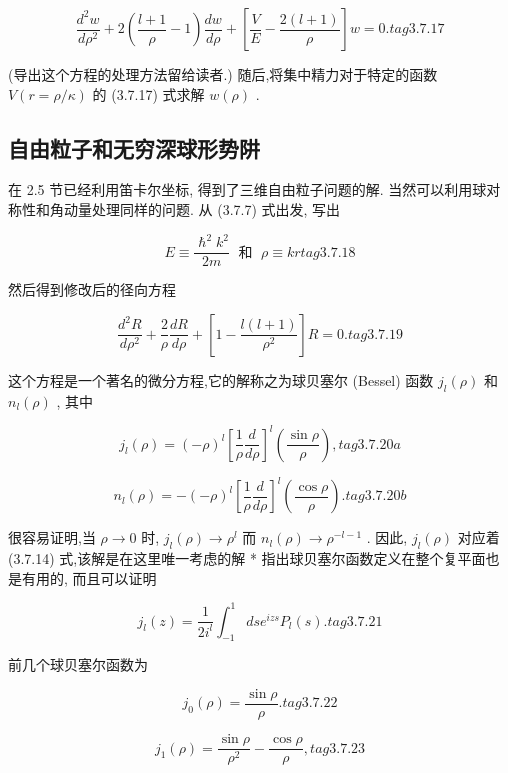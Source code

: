 $$
\frac{{d}^{2}w}{d{\rho }^{2}} + 2\left( {\frac{l + 1}{\rho } - 1}\right) \frac{dw}{d\rho } + \left\lbrack {\frac{V}{E} - \frac{2\left( {l + 1}\right) }{\rho }}\right\rbrack w = 0. tag{3. 7.17}
$$

(导出这个方程的处理方法留给读者.) 随后,将集中精力对于特定的函数 $V\left( {r = \rho /\kappa }\right)$ 的 (3.7.17) 式求解 $w\left( \rho \right)$ .

\subsection{自由粒子和无穷深球形势阱}

在 2.5 节已经利用笛卡尔坐标, 得到了三维自由粒子问题的解. 当然可以利用球对称性和角动量处理同样的问题. 从 (3.7.7) 式出发, 写出

$$
E \equiv \frac{{\hslash }^{2}{k}^{2}}{2m}\;\text{ 和 }\;\rho \equiv {kr} tag{3. 7.18}
$$

然后得到修改后的径向方程

$$
\frac{{d}^{2}R}{d{\rho }^{2}} + \frac{2}{\rho }\frac{dR}{d\rho } + \left\lbrack {1 - \frac{l\left( {l + 1}\right) }{{\rho }^{2}}}\right\rbrack R = 0. tag{3. 7.19}
$$

这个方程是一个著名的微分方程,它的解称之为球贝塞尔 (Bessel) 函数 ${j}_{l}\left( \rho \right)$ 和 ${n}_{l}\left( \rho \right)$ , 其中

$$
{j}_{l}\left( \rho \right) = {\left( -\rho \right) }^{l}{\left\lbrack \frac{1}{\rho }\frac{d}{d\rho }\right\rbrack }^{l}\left( \frac{\sin \rho }{\rho }\right) , tag{3. 7. 20a}
$$

$$
{n}_{l}\left( \rho \right) = - {\left( -\rho \right) }^{l}{\left\lbrack \frac{1}{\rho }\frac{d}{d\rho }\right\rbrack }^{l}\left( \frac{\cos \rho }{\rho }\right) . tag{3. 7. 20b}
$$

很容易证明,当 $\rho \rightarrow 0$ 时, ${j}_{l}\left( \rho \right) \rightarrow {\rho }^{l}$ 而 ${n}_{l}\left( \rho \right) \rightarrow {\rho }^{-l - 1}$ . 因此, ${j}_{l}\left( \rho \right)$ 对应着 (3.7.14) 式,该解是在这里唯一考虑的解 * 指出球贝塞尔函数定义在整个复平面也是有用的, 而且可以证明

$$
{j}_{l}\left( z\right) = \frac{1}{2{i}^{l}}{\int }_{-1}^{1}{ds}{e}^{izs}{P}_{l}\left( s\right) . tag{3. 7.21}
$$

前几个球贝塞尔函数为

$$
{j}_{0}\left( \rho \right) = \frac{\sin \rho }{\rho }. tag{3.7.22}
$$

$$
{j}_{1}\left( \rho \right) = \frac{\sin \rho }{{\rho }^{2}} - \frac{\cos \rho }{\rho }, tag{3. 7.23}
$$

